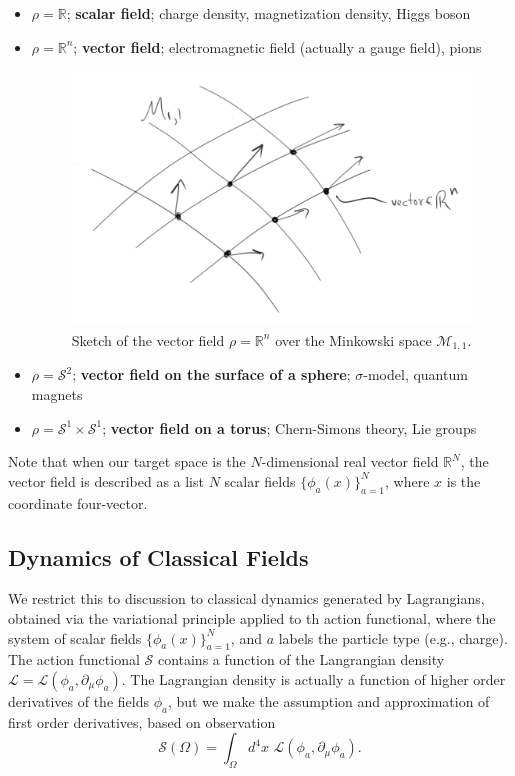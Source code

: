 \begin{itemize}
\item $\rho = \mathbb{R}$; \textbf{scalar field}; charge density, magnetization density, Higgs boson
\item $\rho = \mathbb{R}^n$; \textbf{vector field}; electromagnetic field (actually a gauge field), pions
	\begin{figure}[H]
		\centering
		\includegraphics[scale=0.25]{vectorfield.png}
		\caption{Sketch of the vector field $\rho = \mathbb{R}^n$ over the Minkowski space $\mathcal{M}_{1,1}$.}
		\label{fig:fig1}
	\end{figure}
\item $\rho = \mathcal{S}^2$;  \textbf{vector field on the surface of a sphere};  $\sigma$-model, quantum magnets
\item $\rho = \mathcal{S}^1 \times \mathcal{S}^1$; \textbf{vector field on a torus}; Chern-Simons theory, Lie groups
\end{itemize}

\noindent Note that when our target space is the $N$-dimensional real vector field $\mathbb{R}^N$, the vector field is described as a list $N$ scalar fields $\{\phi_a(x)\}_{a=1}^N$, where $x$ is the coordinate four-vector.

\subsection*{Dynamics of Classical Fields}

\noindent We restrict this to discussion to classical dynamics generated by Lagrangians, obtained via the variational principle applied to th action functional, where the system of scalar fields $\{\phi_a(x)\}_{a=1}^N$, and $a$ labels the particle type (e.g., charge). The action functional $\mathcal{S}$ contains a function of the Langrangian density $\mathscr{L} = \mathscr{L}(\phi_a, \partial_\mu \phi_a)$. The Lagrangian density is actually a function of higher order derivatives of the fields $\phi_a$, but we make the assumption and approximation of first order derivatives, based on observation
\begin{equation}
\mathcal{S}(\Omega) = \int_\Omega d^4 x \,\, \mathscr{L}(\phi_a, \partial_\mu \phi_a). 
\end{equation}

